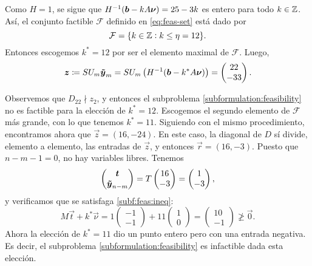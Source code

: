\begin{example}
	Como $H = 1$, se sigue que $H^{-1} (\boldsymbol{b} - kA\boldsymbol{\nu}) = 25 - 3k$ es entero para todo $k
	\in \mathbb{Z}$. Así, el conjunto factible $\mathcal{F}$ definido en \ref{eq:feas-set} está dado por
	\begin{equation*}
		\mathcal{F} 
		= \lbrace k \in \mathbb{Z} \vcentcolon k \leq \eta = 12 \rbrace.
	\end{equation*}
	Entonces escogemos $k^* = 12$ por ser el elemento maximal de $\mathcal{F}$. Luego,
	\begin{equation*}
		\boldsymbol{z} \coloneq SU_m\boldsymbol{\tilde{y}}_m = SU_m \left(H^{-1} (\boldsymbol{b} - k^*A\boldsymbol{\nu})\right)
		= \begin{pmatrix} 22 \\ -33 \end{pmatrix}.
	\end{equation*}

	Observemos que $D_{22} \nmid z_2$, y entonces el subproblema \eqref{subformulation:feasibility}
	no es factible para la elección de $k^* = 12$. Escogemos el segundo elemento de $\mathcal{F}$
	más grande, con lo que tenemos $k^* = 11$. Siguiendo con el mismo procedimiento, encontramos
	ahora que $\vec{z} = (16, -24)$. En este caso, la diagonal de $D$ sí divide, elemento a elemento,
	las entradas de $\vec{z}$, y entonces $\vec{r} = (16, -3)$. Puesto que $n - m - 1 = 0$, no hay
	variables libres. Tenemos
	\begin{equation*}
		\begin{pmatrix} \boldsymbol{t} \\ \boldsymbol{\tilde{y}}_{n-m} \end{pmatrix} = T
		\begin{pmatrix} 16 \\ -3 \end{pmatrix} = \begin{pmatrix} 1 \\ -3 \end{pmatrix},
	\end{equation*}
	y verificamos que se satisfaga \eqref{subf:feas:ineq}:
	\begin{equation*}
		M\vec{t} + k^*\vec{\nu}
		= 1 \begin{pmatrix} -1 \\ -1 \end{pmatrix} + 11 \begin{pmatrix} 1 \\ 0 \end{pmatrix}
		= \begin{pmatrix} 10 \\ -1 \end{pmatrix} \not \geq \vec{0}.
	\end{equation*}
	Ahora la elección de $k^* = 11$ dio un punto entero pero con una entrada negativa. Es decir, el
	subproblema \eqref{subformulation:feasibility} es infactible dada esta elección.


\end{example}
